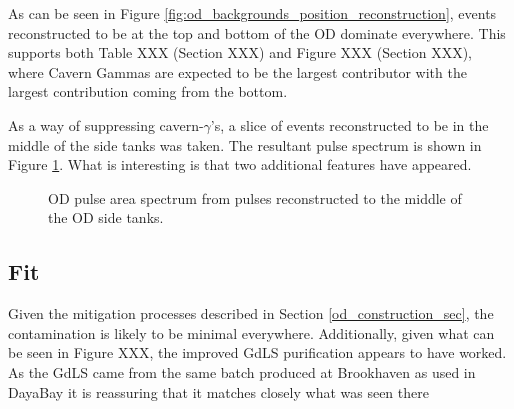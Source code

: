 \par
As can be seen in Figure \ref{fig:od_backgrounds_position_reconstruction}, events reconstructed to be at the top and bottom of the OD dominate everywhere.
This supports both Table XXX (Section XXX) and Figure XXX (Section XXX), where Cavern Gammas are expected to be the largest contributor with the largest contribution coming from the bottom.


\par
As a way of suppressing cavern-$\gamma$'s, a slice of events reconstructed to be in the middle of the side tanks was taken.
The resultant pulse spectrum is shown in Figure \ref{fig:od_data_pulsearea_middle_tank}.
What is interesting is that two additional features have appeared.


\begin{figure}[!htbp]
    \centering
    \caption{OD pulse area spectrum from pulses reconstructed to the middle of the OD side tanks.}
    \label{fig:od_data_pulsearea_middle_tank}
\end{figure}


\subsection{Fit}
\par
Given the mitigation processes described in Section \ref{od_construction_sec}, the contamination is likely to be minimal everywhere. 
Additionally, given what can be seen in Figure XXX, the improved GdLS purification appears to have worked.
As the GdLS came from the same batch produced at Brookhaven as used in DayaBay it is reassuring that it matches closely what was seen there

